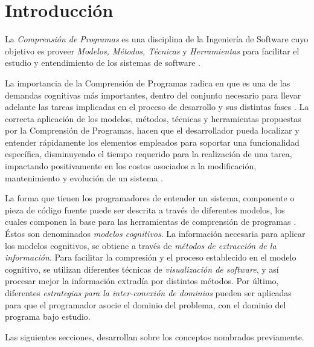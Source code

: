 \section{Introducción}

La \textit{Comprensión de Programas} es una disciplina de la Ingeniería de Software
cuyo objetivo es proveer \textit{Modelos, Métodos, Técnicas} y \textit{Herramientas}
para facilitar el estudio y entendimiento de los sistemas de software \cite{BeronHenriquesPereira10}.

La importancia de la Comprensión de Programas radica en que es una de las demandas cognitivas
más importantes, dentro del conjunto necesario para llevar adelante las tareas implicadas
en el proceso de desarrollo y sus distintas fases \cite{PetreDeQuincey06}.
La correcta aplicación de los modelos, métodos, técnicas y herramientas propuestas por
la Comprensión de Programas, hacen que el desarrollador pueda localizar y entender rápidamente
los elementos empleados para soportar una funcionalidad específica, disminuyendo el tiempo requerido
para la realización de una tarea, impactando positivamente en los costos asociados a la
modificación, mantenimiento y evolución de un sistema \cite{BeronHenriquesPereira10}.

La forma que tienen los programadores de entender un sistema, componente o pieza de código fuente
puede ser descrita a través de diferentes modelos, los cuales componen la base para las herramientas
de comprensión de programas \cite{BeronHenriquesPereiraUzal07}.
Éstos son denominados \textit{modelos cognitivos}.
La información necesaria para aplicar los modelos cognitivos, se obtiene a través de
\textit{métodos de extracción de la información}.
Para facilitar la compresión y el proceso establecido en el modelo cognitivo, se utilizan
diferentes técnicas de \textit{visualización de software}, y así procesar mejor la
información extradía por distintos métodos.
Por último, diferentes \textit{estrategias para la inter-conexión de dominios} pueden ser
aplicadas para que el programador asocie el dominio del problema, con el dominio
del programa bajo estudio.

Las siguientes secciones, desarrollan sobre los conceptos nombrados previamente.
